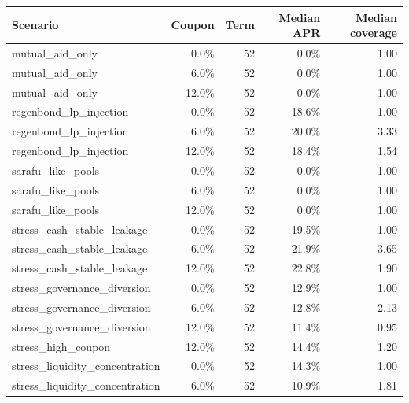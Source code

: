 \begingroup
\small
\setlength{\tabcolsep}{3pt}
\begin{tabular}{lrrrr}
\toprule
Scenario & Coupon & Term & Median APR & Median coverage \\
\midrule
mutual\_aid\_only & 0.0\% & 52 & 0.0\% & 1.00 \\
mutual\_aid\_only & 6.0\% & 52 & 0.0\% & 1.00 \\
mutual\_aid\_only & 12.0\% & 52 & 0.0\% & 1.00 \\
regenbond\_lp\_injection & 0.0\% & 52 & 18.6\% & 1.00 \\
regenbond\_lp\_injection & 6.0\% & 52 & 20.0\% & 3.33 \\
regenbond\_lp\_injection & 12.0\% & 52 & 18.4\% & 1.54 \\
sarafu\_like\_pools & 0.0\% & 52 & 0.0\% & 1.00 \\
sarafu\_like\_pools & 6.0\% & 52 & 0.0\% & 1.00 \\
sarafu\_like\_pools & 12.0\% & 52 & 0.0\% & 1.00 \\
stress\_cash\_stable\_leakage & 0.0\% & 52 & 19.5\% & 1.00 \\
stress\_cash\_stable\_leakage & 6.0\% & 52 & 21.9\% & 3.65 \\
stress\_cash\_stable\_leakage & 12.0\% & 52 & 22.8\% & 1.90 \\
stress\_governance\_diversion & 0.0\% & 52 & 12.9\% & 1.00 \\
stress\_governance\_diversion & 6.0\% & 52 & 12.8\% & 2.13 \\
stress\_governance\_diversion & 12.0\% & 52 & 11.4\% & 0.95 \\
stress\_high\_coupon & 12.0\% & 52 & 14.4\% & 1.20 \\
stress\_liquidity\_concentration & 0.0\% & 52 & 14.3\% & 1.00 \\
stress\_liquidity\_concentration & 6.0\% & 52 & 10.9\% & 1.81 \\
\bottomrule
\end{tabular}
\endgroup
